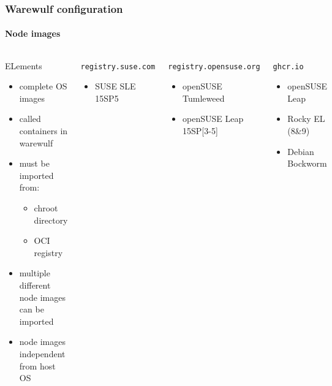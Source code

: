 \documentclass[aspectratio=169]{beamer}
\begin{document}
\begin{frame}[fragile]
\frametitle{Warewulf configuration}
\framesubtitle{Node images}
\begin{columns}
\begin{block}{ELements}
\begin{itemize}
  \item complete OS images
  \item called containers in warewulf
  \item must be imported from:
  \begin{itemize}
    \item chroot directory
    \item OCI registry
  \end{itemize}
  \item multiple different node images can be imported
  \item node images independent from host OS
\end{itemize}
\end{block}
\begin{block}{\texttt{registry.suse.com}}
  \begin{itemize}
    \item SUSE SLE 15SP5
  \end{itemize}
\end{block}
\begin{block}{\texttt{registry.opensuse.org}}
  \begin{itemize}
    \item openSUSE Tumleweed
    \item openSUSE Leap 15SP[3-5]
   \end{itemize}
\end{block}
\begin{block}{\texttt{ghcr.io}}
  \begin{itemize}
    \item openSUSE Leap
    \item Rocky EL (8\&9)
    \item Debian Bockworm
  \end{itemize}
\end{block}
\end{columns}
\end{frame}
\end{document}
